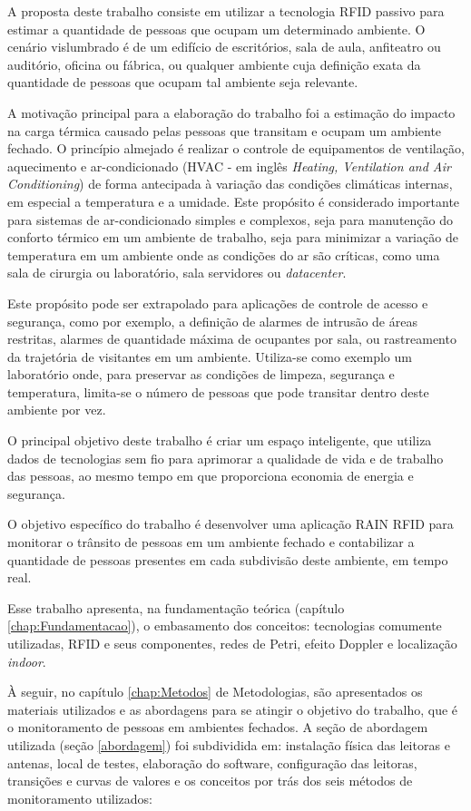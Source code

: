 A proposta deste trabalho consiste em utilizar a tecnologia RFID passivo para estimar a quantidade de pessoas que ocupam um determinado ambiente. O cenário vislumbrado é de um edifício de escritórios, sala de aula, anfiteatro ou auditório, oficina ou fábrica, ou qualquer ambiente cuja definição exata da quantidade de pessoas que ocupam tal ambiente seja relevante.

A motivação principal para a elaboração do trabalho foi a estimação do impacto na carga térmica causado pelas pessoas que transitam e ocupam um ambiente fechado. O princípio almejado é realizar o controle de equipamentos de ventilação, aquecimento e ar-condicionado (HVAC - em inglês \textit{Heating, Ventilation and Air Conditioning}) de forma antecipada à variação das condições climáticas internas, em especial a temperatura e a umidade. Este propósito é considerado importante para sistemas de ar-condicionado simples e complexos, seja para manutenção do conforto térmico em um ambiente de trabalho, seja para minimizar a variação de temperatura em um ambiente onde as condições do ar são críticas, como uma sala de cirurgia ou laboratório, sala servidores ou \textit{datacenter}.

Este propósito pode ser extrapolado para aplicações de controle de acesso e segurança, como por exemplo, a definição de alarmes de intrusão de áreas restritas, alarmes de quantidade máxima de ocupantes por sala, ou rastreamento da trajetória de visitantes em um ambiente. Utiliza-se como exemplo um laboratório onde, para preservar as condições de limpeza, segurança e temperatura, limita-se o número de pessoas que pode transitar dentro deste ambiente por vez.

O principal objetivo deste trabalho é criar um espaço inteligente, que utiliza dados de tecnologias sem fio para aprimorar a qualidade de vida e de trabalho das pessoas, ao mesmo tempo em que proporciona economia de energia e segurança.

O objetivo específico do trabalho é desenvolver uma aplicação RAIN RFID para monitorar o trânsito de pessoas em um ambiente fechado e contabilizar a quantidade de pessoas presentes em cada subdivisão deste ambiente, em tempo real.

Esse trabalho apresenta, na fundamentação teórica (capítulo \ref{chap:Fundamentacao}), o embasamento dos conceitos: tecnologias comumente utilizadas, RFID e seus componentes, redes de Petri, efeito Doppler e localização \textit{indoor}.

À seguir, no capítulo \ref{chap:Metodos} de Metodologias, são apresentados os materiais utilizados e as abordagens para se atingir o objetivo do trabalho, que é o monitoramento de pessoas em ambientes fechados. A seção de abordagem utilizada (seção \ref{abordagem}) foi subdividida em: instalação física das leitoras e antenas, local de testes, elaboração do software, configuração das leitoras, transições e curvas de valores e os conceitos por trás dos seis métodos de monitoramento utilizados:

